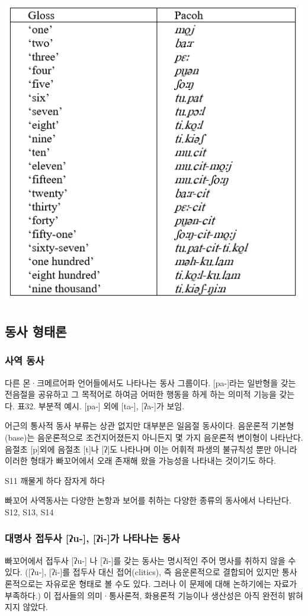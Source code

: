 \includegraphics{Pacoh/src/Pacohnumerals.png}

\subsection{동사 형태론}
\subsubsection{사역 동사}
다른 몬·크메르어파 언어들에서도 나타나는 동사 그룹이다. [pa-]라는 일반형을 갖는 전음절을 공유하고 그 목적어로 하여금 어떠한 행동을 하게 하는 의미적 기능을 갖는다.
표32. 부분적 예시. [pa-] 외에 [ta-], [ʔa-]가 보임.

어근의 통사적 동사 부류는 상관 없지만 대부분은 일음절 동사이다. 음운론적 기본형(base)는 음운론적으로 조건지어졌든지 아니든지 몇 가지 음운론적 변이형이 나타난다. 음절초 [p]외에 음절초 [t]나 [ʔ]도 나타나며 이는 어휘적 파생의 불규칙성 뿐만 아니라 이러한 형태가 빠꼬어에서 오래 존재해 왔을 가능성을 나타내는 것이기도 하다.

S11 깨물게 하다 잠자게 하다

빠꼬어 사역동사는 다양한 논항과 보어를 취하는 다양한 종류의 동사에서 나타난다.
S12, S13, S14

\subsubsection{대명사 접두사 [ʔu-], [ʔi-]가 나타나는 동사}
빠꼬어에서 접두사 [ʔu-] 나 [ʔi-]를 갖는 동사는
명시적인 주어 명사를 취하지 않을 수 있다. ([ʔu-], [ʔi-]를 접두사 대신 접어(clitics), 즉 음운론적으로 결합되어 있지만 통사론적으로는 자유로운 형태로 볼 수도 있다. 그러나 이 문제에 대해 논하기에는 자료가 부족하다.)
이 접사들의 의미·통사론적, 화용론적 기능이나 생산성은 아직 완전히 밝혀지지 않았다.


